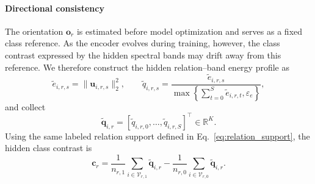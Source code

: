 \documentclass[10pt,journal]{IEEEtran}
\begin{document}
\paragraph{Directional consistency}
The orientation $\mathbf{o}_r$ is estimated before model optimization and
serves as a fixed class reference. As the encoder evolves during training,
however, the class contrast expressed by the hidden spectral bands may drift
away from this reference. We therefore construct the hidden relation--band
energy profile as
\begin{equation}
\widetilde{e}_{i,r,s}
=
\|\mathbf{u}_{i,r,s}\|_2^2,
\qquad
\widetilde{q}_{i,r,s}
=
\frac{
\widetilde{e}_{i,r,s}
}{
\max\left\{
\sum_{t=0}^{S}\widetilde{e}_{i,r,t},
\varepsilon_e
\right\}
},
\label{eq:hidden_profile}
\end{equation}
and collect
\begin{equation}
\widetilde{\mathbf{q}}_{i,r}
=
[
\widetilde q_{i,r,0},
\ldots,
\widetilde q_{i,r,S}
]^\top
\in\mathbb{R}^{K}.
\label{eq:hidden_profile_vector}
\end{equation}
Using the same labeled relation support defined in
Eq.~\eqref{eq:relation_support}, the hidden class contrast is
\begin{equation}
\mathbf{c}_r
=
\frac{1}{n_{r,1}}
\sum_{i\in\mathcal{V}_{r,1}}
\widetilde{\mathbf{q}}_{i,r}
-
\frac{1}{n_{r,0}}
\sum_{i\in\mathcal{V}_{r,0}}
\widetilde{\mathbf{q}}_{i,r}.
\label{eq:hidden_contrast}
\end{equation}
\end{document}
